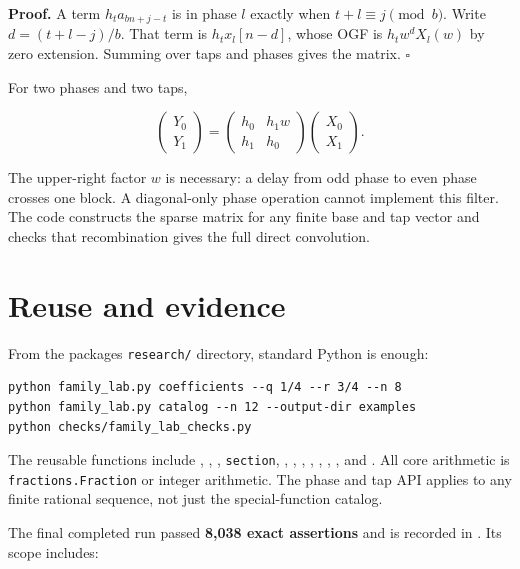 \textbf{Proof.} A term \(h_t a_{bn+j-t}\) is in phase \(l\) exactly when
\(t+l\equiv j\pmod b\). Write \(d=(t+l-j)/b\). That term is
\(h_t x_l[n-d]\), whose OGF is \(h_tw^dX_l(w)\) by zero extension.
Summing over taps and phases gives the matrix. \(\square\)

For two phases and two taps,

\[
\begin{pmatrix}Y_0\\Y_1\end{pmatrix}
=\begin{pmatrix}h_0&h_1w\\h_1&h_0\end{pmatrix}
\begin{pmatrix}X_0\\X_1\end{pmatrix}.
\]

The upper-right factor \(w\) is necessary: a delay from odd phase to
even phase crosses one block. A diagonal-only phase operation cannot
implement this filter. The code constructs the sparse matrix for any
finite base and tap vector and checks that recombination gives the full
direct convolution.

\hypertarget{reuse-and-evidence}{%
\section{Reuse and evidence}\label{reuse-and-evidence}}

From the package\textquotesingle s \texttt{research/} directory, standard Python is enough:

\begin{verbatim}
python family_lab.py coefficients --q 1/4 --r 3/4 --n 8
python family_lab.py catalog --n 12 --output-dir examples
python checks/family_lab_checks.py
\end{verbatim}

The reusable functions include ,
, ,
\texttt{section}, , ,
, ,
, ,
, and .
All core arithmetic is \texttt{fractions.Fraction} or integer
arithmetic. The phase and tap API applies to any finite rational
sequence, not just the special-function catalog.

The final completed run passed \textbf{8,038 exact assertions} and is
recorded in . Its scope
includes:

